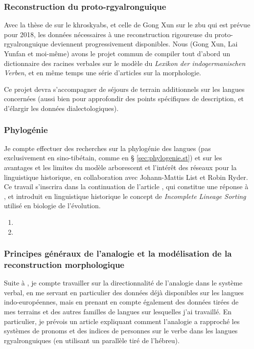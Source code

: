 \documentclass[oldfontcommands,oneside,a4paper,11pt]{article}
\begin{document}
\subsubsection{Reconstruction du proto-rgyalronguique}

Avec la thèse de \citet{lai17khroskyabs} sur le khroskyabs, et celle de Gong Xun sur le zbu qui est prévue pour 2018, les données nécessaires à une reconstruction rigoureuse du proto-rgyalronguique deviennent progressivement disponibles. Nous (Gong Xun, Lai Yunfan et moi-même) avons le projet commun de compiler  tout d'abord un dictionnaire des racines verbales sur le modèle du \textit{Lexikon der indogermanischen Verben}, et en même temps une série d'articles sur la morphologie.

Ce projet devra s'accompagner de séjours de terrain additionnels sur les langues concernées (aussi bien pour approfondir des points spécifiques de description, et d'élargir les données dialectologiques).

\subsubsection{Phylogénie} \label{sec:phylogenie}
Je compte effectuer des recherches sur la phylogénie des langues (pas exclusivement en sino-tibétain, comme en § \ref{sec:phylogenie.st}) et sur les avantages et les limites du modèle arborescent et l'intérêt des réseaux pour la linguistique historique, en collaboration avec Johann-Mattis List et Robin Ryder. Ce travail s'inscrira dans la continuation de l'article \citet{list2019save.the.trees}, qui constitue une réponse à \citet{francois15tree}, et introduit en linguistique historique le concept de \textit{Incomplete Lineage Sorting} utilisé en biologie de l'évolution.

\begin{enumerate}
 \item  {}
  \item  {}
\end{enumerate}

\subsubsection{Principes généraux de l'analogie et la modélisation de la reconstruction morphologique}
Suite à \citet{jacques16ebde}, je compte travailler sur la directionnalité de l'analogie dans le système verbal, en me servant en particulier des données déjà disponibles sur les langues indo-européennes, mais en prenant en compte également des données tirées de mes terrains et des autres familles de langues sur lesquelles j'ai travaillé. En particulier, je prévois un article expliquant comment l'analogie a rapproché les systèmes de pronoms et des indices de personnes sur le verbe dans les langues rgyalronguiques (en utilisant un parallèle tiré de l'hébreu).
\end{document}
